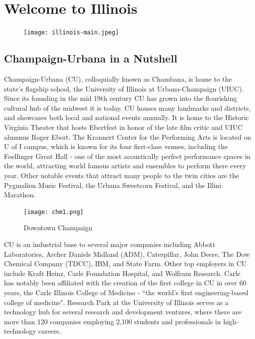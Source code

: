 \section{Welcome to Illinois}

\begin{figure}[H]
  \centering
  \texttt{[image: illinois-main.jpeg]}
\end{figure}

\subsection{Champaign-Urbana in a Nutshell}
Champaign-Urbana (CU), colloquially known as Chambana, is home to the state's flagship school, the University of Illinois at Urbana-Champaign (UIUC). Since its founding in the mid 19th century CU has grown into the flourishing cultural hub of the midwest it is today. CU houses many landmarks and districts, and showcases both local and national events annually. It is home to the Historic Virginia Theater that hosts Ebertfest in honor of the late film critic and UIUC alumnus Roger Ebert. The Krannert Center for the Performing Arts is located on U of I campus, which is known for its four first-class venues, including the Foellinger Great Hall - one of the most acoustically perfect performance spaces in the world, attracting world famous artists and ensembles to perform there every year. Other notable events that attract many people to the twin cities are the Pygmalion Music Festival, the Urbana Sweetcorn Festival, and the Illini Marathon. 

\begin{figure}
  \begin{center}
  \vspace{-\baselineskip}
    \texttt{[image: chm1.png]}
    \caption{Downtown Champaign}
  \end{center}
\end{figure}


CU is an industrial base to several major companies including Abbott Laboratories, Archer Daniels Midland (ADM), Caterpillar, John Deere, The Dow Chemical Company (TDCC), IBM, and State Farm. Other top employers in CU include Kraft Heinz, Carle Foundation Hospital, and Wolfram Research. Carle has notably been affiliated with the creation of the first college in CU in over 60 years, the Carle Illinois College of Medicine -  ``the world's first engineering-based college of medicine". Research Park at the University of Illinois serves as a technology hub for several research and development ventures, where there are more than 120 companies employing 2,100 students and professionals in high-technology careers.

